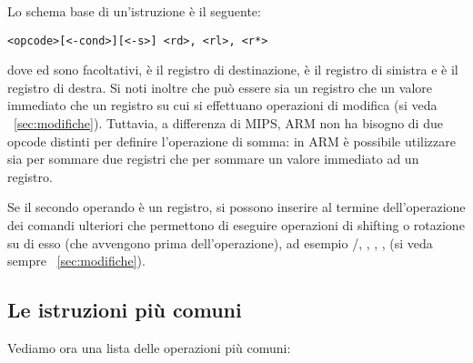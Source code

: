 \documentclass[class=book, crop=false, oneside]{standalone}
\begin{document}
Lo schema base di un'istruzione è il seguente:
\begin{center}
	\texttt{<opcode>[<-cond>][<-s>] <rd>, <rl>, <r*>}
\end{center}
dove  ed  sono facoltativi,  è il registro di destinazione,  è il registro di sinistra e  è il registro di destra. Si noti inoltre che  può essere sia un registro che un valore immediato che un registro su cui si effettuano operazioni di modifica (si veda ~\ref{sec:modifiche}). Tuttavia, a differenza di MIPS, ARM non ha bisogno di due opcode distinti per definire l'operazione di somma: in ARM è possibile utilizzare  sia per sommare due registri che per sommare un valore immediato ad un registro.

Se il secondo operando è un registro, si possono inserire al termine dell'operazione dei comandi ulteriori che permettono di eseguire operazioni di shifting o rotazione su di esso (che avvengono prima dell'operazione), ad esempio /, , , ,  (si veda sempre ~\ref{sec:modifiche}).

\subsection*{Le istruzioni più comuni}
Vediamo ora una lista delle operazioni più comuni:
\end{document}
